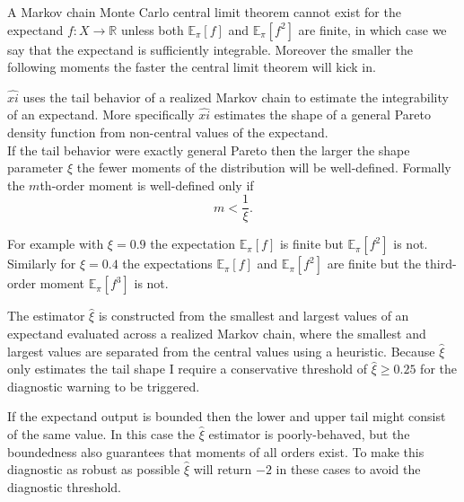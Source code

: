 \documentclass[
  letterpaper,
  DIV=11,
  numbers=noendperiod]{scrartcl}
\begin{document}
A Markov chain Monte Carlo central limit theorem cannot exist for the
expectand \(f : X \rightarrow \mathbb{R}\) unless both
\(\mathbb{E}_{\pi}[f]\) and \(\mathbb{E}_{\pi}[f^{2}]\) are finite, in
which case we say that the expectand is sufficiently integrable.
Moreover the smaller the following moments the faster the central limit
theorem will kick in.

\(\hat{xi}\) uses the tail behavior of a realized Markov chain to
estimate the integrability of an expectand. More specifically
\(\hat{xi}\) estimates the shape of a general Pareto density function
from non-central values of the expectand.\\
If the tail behavior were exactly general Pareto then the larger the
shape parameter \(\xi\) the fewer moments of the distribution will be
well-defined. Formally the \(m\)th-order moment is well-defined only if
\[
m < \frac{1}{\xi}.
\]

For example with \(\xi = 0.9\) the expectation \(\mathbb{E}_{\pi}[f]\)
is finite but \(\mathbb{E}_{\pi}[f^{2}]\) is not. Similarly for
\(\xi = 0.4\) the expectations \(\mathbb{E}_{\pi}[f]\) and
\(\mathbb{E}_{\pi}[f^{2}]\) are finite but the third-order moment
\(\mathbb{E}_{\pi}[f^{3}]\) is not.

The estimator \(\hat{\xi}\) is constructed from the smallest and largest
values of an expectand evaluated across a realized Markov chain, where
the smallest and largest values are separated from the central values
using a heuristic. Because \(\hat{\xi}\) only estimates the tail shape I
require a conservative threshold of \(\hat{\xi} \ge 0.25\) for the
diagnostic warning to be triggered.

If the expectand output is bounded then the lower and upper tail might
consist of the same value. In this case the \(\hat{\xi}\) estimator is
poorly-behaved, but the boundedness also guarantees that moments of all
orders exist. To make this diagnostic as robust as possible
\(\hat{\xi}\) will return \(-2\) in these cases to avoid the diagnostic
threshold.
\end{document}

